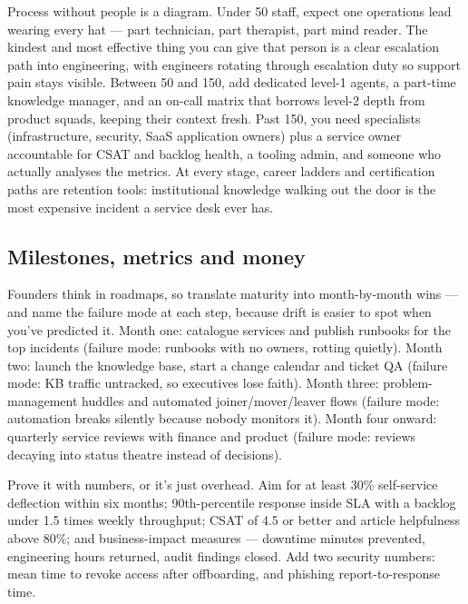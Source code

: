 Process without people is a diagram. Under 50 staff, expect one operations lead wearing every hat — part technician, part therapist, part mind reader. The kindest and most effective thing you can give that person is a clear escalation path into engineering, with engineers rotating through escalation duty so support pain stays visible. Between 50 and 150, add dedicated level-1 agents, a part-time knowledge manager, and an on-call matrix that borrows level-2 depth from product squads, keeping their context fresh. Past 150, you need specialists (infrastructure, security, SaaS application owners) plus a service owner accountable for CSAT and backlog health, a tooling admin, and someone who actually analyses the metrics. At every stage, career ladders and certification paths are retention tools: institutional knowledge walking out the door is the most expensive incident a service desk ever has.



\subsection{Milestones, metrics and money}


Founders think in roadmaps, so translate maturity into month-by-month wins — and name the failure mode at each step, because drift is easier to spot when you've predicted it. Month one: catalogue services and publish runbooks for the top incidents (failure mode: runbooks with no owners, rotting quietly). Month two: launch the knowledge base, start a change calendar and ticket QA (failure mode: KB traffic untracked, so executives lose faith). Month three: problem-management huddles and automated joiner/mover/leaver flows (failure mode: automation breaks silently because nobody monitors it). Month four onward: quarterly service reviews with finance and product (failure mode: reviews decaying into status theatre instead of decisions).


Prove it with numbers, or it's just overhead. Aim for at least 30\% self-service deflection within six months; 90th-percentile response inside SLA with a backlog under 1.5 times weekly throughput; CSAT of 4.5 or better and article helpfulness above 80\%; and business-impact measures — downtime minutes prevented, engineering hours returned, audit findings closed. Add two security numbers: mean time to revoke access after offboarding, and phishing report-to-response time.


